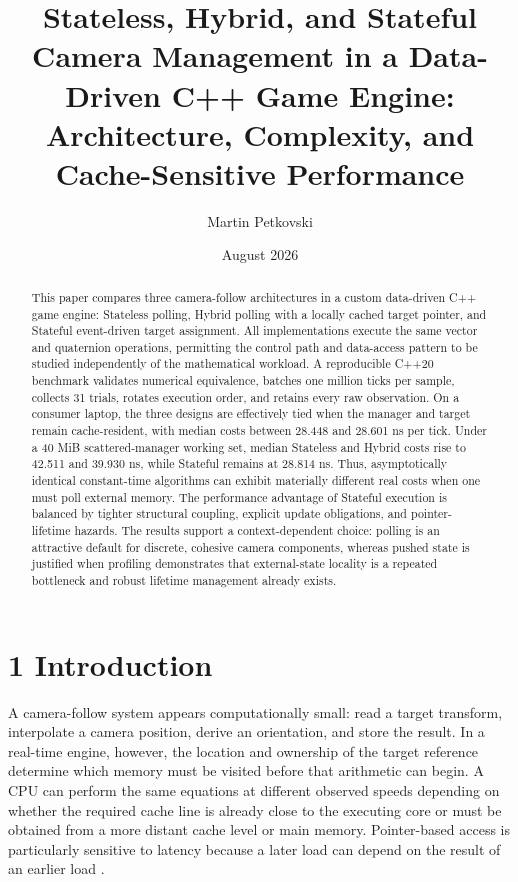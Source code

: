 \title{Stateless, Hybrid, and Stateful Camera Management in a Data-Driven C++ Game Engine: Architecture, Complexity, and Cache-Sensitive Performance}
\author{Martin Petkovski}
\date{August 2026}


\maketitle

\begin{abstract}
This paper compares three camera-follow architectures in a custom data-driven C++ game engine: Stateless polling, Hybrid polling with a locally cached target pointer, and Stateful event-driven target assignment. All implementations execute the same vector and quaternion operations, permitting the control path and data-access pattern to be studied independently of the mathematical workload. A reproducible C++20 benchmark validates numerical equivalence, batches one million ticks per sample, collects 31 trials, rotates execution order, and retains every raw observation. On a consumer laptop, the three designs are effectively tied when the manager and target remain cache-resident, with median costs between 28.448 and 28.601 ns per tick. Under a 40 MiB scattered-manager working set, median Stateless and Hybrid costs rise to 42.511 and 39.930 ns, while Stateful remains at 28.814 ns. Thus, asymptotically identical constant-time algorithms can exhibit materially different real costs when one must poll external memory. The performance advantage of Stateful execution is balanced by tighter structural coupling, explicit update obligations, and pointer-lifetime hazards. The results support a context-dependent choice: polling is an attractive default for discrete, cohesive camera components, whereas pushed state is justified when profiling demonstrates that external-state locality is a repeated bottleneck and robust lifetime management already exists.
\end{abstract}

\section{1 Introduction}

A camera-follow system appears computationally small: read a target transform, interpolate a camera position, derive an orientation, and store the result. In a real-time engine, however, the location and ownership of the target reference determine which memory must be visited before that arithmetic can begin. A CPU can perform the same equations at different observed speeds depending on whether the required cache line is already close to the executing core or must be obtained from a more distant cache level or main memory. Pointer-based access is particularly sensitive to latency because a later load can depend on the result of an earlier load \cite{weisz2016}.


